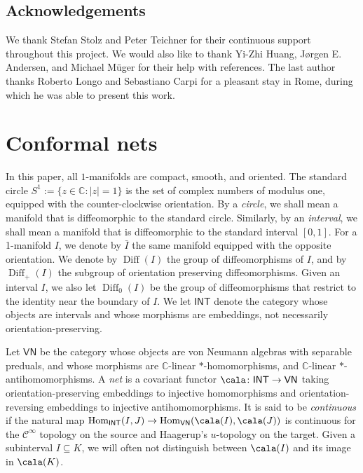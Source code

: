\documentclass[a4paper,10pt,leqno]{amsart}
\newcommand{\IC}{\mathbb{C}}     \newcommand{\calc}{\mathcal{C}}
\newcounter{
  counter}
\theoremstyle{plain}
\theoremstyle{definition}
\theoremstyle{remark}
\DeclareMathOperator{\Diff}{Diff}
\newcommand{\INT}{{\mathsf{INT}}}
\newcommand{\VN}{{\mathsf{VN}}}
\DeclareRobustCommand{\SkipTocEntry}[5]{}
\begin{document}
\subsection*{Acknowledgements} 
We thank Stefan Stolz and Peter Teichner for their continuous support throughout this project.
We would also like to thank Yi-Zhi Huang, J\o rgen E. Andersen, and Michael M\"uger for their help with references.
The last author thanks Roberto Longo and Sebastiano Carpi for a pleasant stay in Rome, during which he was able to present this work.




\section{Conformal nets} \label{sec:nets}

In this paper, all $1$-manifolds are compact, smooth, and oriented.
The standard circle $S^1:=\{z\in \IC:|z|=1\}$ is the set of complex numbers of modulus one, equipped with the counter-clockwise orientation.
By a \emph{circle}, we shall mean a manifold that is diffeomorphic to the standard circle.
Similarly, by an \emph{interval}, we shall mean a manifold that is diffeomorphic to the standard interval $[0,1]$. 
For a 1-manifold $I$, we denote by $\bar I$ the same manifold equipped with the opposite orientation.
We denote by $\Diff(I)$ the group of diffeomorphisms of $I$, and by $\Diff_+(I)$ the subgroup of orientation preserving diffeomorphisms.
Given an interval $I$, we also let $\Diff_0(I)$ be the group of diffeomorphisms that restrict to the identity near the boundary of $I$.
We let $\INT$ denote the category whose objects are intervals and whose morphisms are embeddings, not necessarily orientation-preserving.

Let $\VN$ be the category whose objects are von Neumann algebras with separable preduals, and whose morphisms are $\IC$-linear $\ast$-homomorphisms, and $\IC$-linear $\ast$-antihomomorphisms.
A \emph{net} is a covariant functor $\cala \colon \INT \to \VN$ taking 
orientation-preserving embeddings to injective homomorphisms and orientation-reversing embeddings to injective antihomomorphisms.
It is said to be \emph{continuous} if the natural map $\mathrm{Hom}_{\INT}(I,J)\to \mathrm{Hom}_{\VN}(\cala(I),\cala(J))$ is continuous for the $\mathcal C^\infty$ topology on the source and Haagerup's $u$-topology on the target.
Given a subinterval $I \subseteq K$, we will often not distinguish between $\cala(I)$ and its image in $\cala(K)$.
\end{document}
